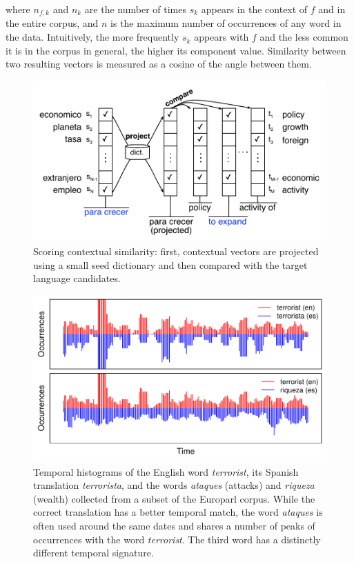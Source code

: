 \documentclass[11pt]{article}
\newcommand{\mnote}[1]{\marginpar{%
  \vskip-\baselineskip
  \raggedright\footnotesize
  \itshape\hrule\smallskip\tiny{#1}\par\smallskip\hrule}}
\newcommand{\mtodo}[1]{\mnote{\textcolor{red}{#1}}}
\begin{document}
\noindent where $n_{f,k}$ and $n_{k}$ are the number of times $s_{k}$ appears in the context of $f$ and in the entire corpus, and $n$ is the maximum number of occurrences of any word in the data.  Intuitively, the more frequently $s_{k}$ appears with $f$ and the less common it is in the corpus in general, the higher its component value.  Similarity between two resulting vectors is measured as a cosine of the angle between them.

\begin{figure}[t]
\includegraphics[width=\linewidth]{../figures/contextual/contextual}
\caption{Scoring contextual similarity: first, contextual vectors are projected using a small seed dictionary and then compared with the target language candidates.}
\label{fig:contextual}
\end{figure}

\mtodo{Give an example Spanish phrase and the English phrases that it has the highest similarity with}

\begin{figure}[t]
\includegraphics[width= \linewidth]{../figures/temporal/temporal}
\caption{Temporal histograms of the English word {\em terrorist}, its Spanish translation {\em terrorista}, and the words {\em ataques}  (attacks) and {\em riqueza} (wealth) collected from a subset of the Europarl corpus. While the correct translation has a better temporal match, the word {\em ataques} is often used around the same dates and shares a number of peaks of occurrences with the word {\em terrorist}.  The third word has a distinctly different temporal signature.}
\label{fig:temporal}
\end{figure}
\end{document}
